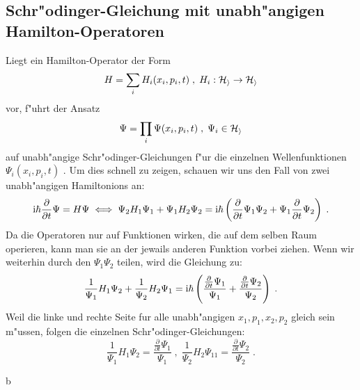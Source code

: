   \subsection{Schr"odinger-Gleichung mit unabh"angigen Hamilton-Operatoren}
    Liegt ein Hamilton-Operator der Form
    \begin{equation}
      H = \sum_i H_i(x_i,p_i,t) \;,\; H_i : \cal H_i \rightarrow H_i
    \end{equation}
    vor, f"uhrt der Ansatz
    \begin{equation}
      \Psi = \prod_i \Psi(x_i,p_i,t) \; , \; \Psi_i \in \cal H_i
    \end{equation}
    auf unabh"angige Schr"odinger-Gleichungen f"ur die einzelnen Wellenfunktionen $\Psi_i(x_i,p_i,t)$ \cite{online quelle}.
    Um dies schnell zu zeigen, schauen wir uns den Fall von zwei unabh"angigen Hamiltonions an:
    \begin{align}
      \begin{split}
        \text i \hbar \frac{\partial}{\partial t} \Psi = H\Psi \iff \Psi_2 H_1 \Psi_1 + \Psi_1 H_2 \Psi_2 = \text i \hbar \left(\frac{\partial}{\partial t} \Psi_1\Psi_2 + \Psi_1\frac{\partial}{\partial t} \Psi_2 \right) \; .
      \end{split}
    \end{align}
    Da die Operatoren nur auf Funktionen wirken, die auf dem selben Raum operieren, kann man sie an der jewails anderen Funktion vorbei ziehen.
    Wenn wir weiterhin durch den $\Psi_1\Psi_2$ teilen, wird die Gleichung zu:
    \begin{equation}
      \frac{1}{\Psi_1}H_1\Psi_2 + \frac{1}{\Psi_2}H_2\Psi_1 = \text i \hbar \left(\frac{\frac{\partial}{\partial t} \Psi_1}{\Psi_1} + \frac{\frac{\partial}{\partial t} \Psi_2}{\Psi_2} \right) \; .
    \end{equation}
    Weil die linke und rechte Seite fur alle unabh"angigen $x_1,p_1,x_2,p_2$ gleich sein m"ussen, folgen die einzelnen Schr"odinger-Gleichungen:
    \begin{equation}
      \frac{1}{\Psi_1}H_1\Psi_2 = \frac{\frac{\partial}{\partial t} \Psi_1}{\Psi_1} \; , \; \frac{1}{\Psi_2}H_2\Psi_11 = \frac{\frac{\partial}{\partial t} \Psi_2}{\Psi_2} \; .
    \end{equation}
































   b
